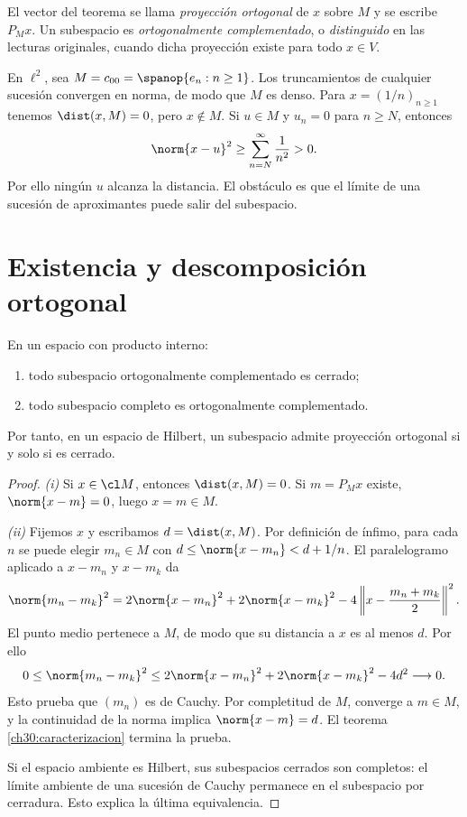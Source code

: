 \begin{definicion}
El vector del teorema se llama \emph{proyección ortogonal} de $x$ sobre $M$ y se escribe $P_Mx$. Un subespacio es \emph{ortogonalmente complementado}, o \emph{distinguido} en las lecturas originales, cuando dicha proyección existe para todo $x\in V$.
\end{definicion}

\begin{ejemplo}
En $\ell^{2}$, sea $M=c_{00}=\spanop\{e_n:n\geq1\}$. Los truncamientos de cualquier sucesión convergen en norma, de modo que $M$ es denso. Para $x=(1/n)_{n\geq1}$ tenemos $\dist(x,M)=0$, pero $x\notin M$. Si $u\in M$ y $u_n=0$ para $n\geq N$, entonces
\[
 \norm{x-u}^{2}\geq\sum_{n=N}^{\infty}\frac1{n^{2}}>0.
\]
Por ello ningún $u$ alcanza la distancia. El obstáculo es que el límite de una sucesión de aproximantes puede salir del subespacio.
\end{ejemplo}

\section{Existencia y descomposición ortogonal}
\begin{teorema}\label{ch30:proyeccion}
En un espacio con producto interno:
\begin{enumerate}[label=(\roman*)]
 \item todo subespacio ortogonalmente complementado es cerrado;
 \item todo subespacio completo es ortogonalmente complementado.
\end{enumerate}
Por tanto, en un espacio de Hilbert, un subespacio admite proyección ortogonal si y solo si es cerrado.
\end{teorema}
\begin{proof}
\emph{(i)} Si $x\in\cl M$, entonces $\dist(x,M)=0$. Si $m=P_Mx$ existe, $\norm{x-m}=0$, luego $x=m\in M$.

\emph{(ii)} Fijemos $x$ y escribamos $d=\dist(x,M)$. Por definición de ínfimo, para cada $n$ se puede elegir $m_n\in M$ con $d\leq\norm{x-m_n}<d+1/n$. El paralelogramo aplicado a $x-m_n$ y $x-m_k$ da
\[
 \norm{m_n-m_k}^{2}
 =2\norm{x-m_n}^{2}+2\norm{x-m_k}^{2}
 -4\left\|x-\frac{m_n+m_k}{2}\right\|^{2}.
\]
El punto medio pertenece a $M$, de modo que su distancia a $x$ es al menos $d$. Por ello
\[
0\leq\norm{m_n-m_k}^{2}
\leq2\norm{x-m_n}^{2}+2\norm{x-m_k}^{2}-4d^{2}\longrightarrow0.
\]
Esto prueba que $(m_n)$ es de Cauchy. Por completitud de $M$, converge a $m\in M$, y la continuidad de la norma implica $\norm{x-m}=d$. El teorema \ref{ch30:caracterizacion} termina la prueba.

Si el espacio ambiente es Hilbert, sus subespacios cerrados son completos: el límite ambiente de una sucesión de Cauchy permanece en el subespacio por cerradura. Esto explica la última equivalencia.
\end{proof}

